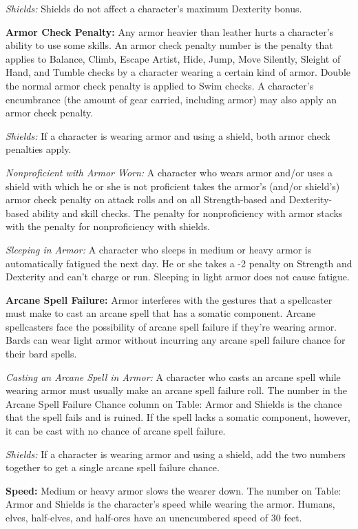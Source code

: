 \documentclass{article}
\begin{document}
\textit{Shields: }Shields do not affect a character's maximum Dexterity bonus.

\textbf{Armor Check Penalty:} Any armor heavier than leather hurts a character's 
ability to use some skills. An armor check penalty number is the penalty that applies 
to Balance, Climb, Escape Artist, Hide, Jump, Move Silently, Sleight of Hand, and 
Tumble checks by a character wearing a certain kind of armor. Double the normal 
armor check penalty is applied to Swim checks. A character's encumbrance (the amount 
of gear carried, including armor) may also apply an armor check penalty.

\textit{Shields: }If a character is wearing armor and using a shield, both armor 
check penalties apply.

\textit{Nonproficient with Armor Worn: }A character who wears armor and/or uses 
a shield with which he or she is not proficient takes the armor's (and/or shield's) 
armor check penalty on attack rolls and on all Strength-based and Dexterity-based 
ability and skill checks. The penalty for nonproficiency with armor stacks with 
the penalty for nonproficiency with shields.

\textit{Sleeping in Armor: }A character who sleeps in medium or heavy armor is 
automatically fatigued the next day. He or she takes a -2 penalty on Strength and 
Dexterity and can't charge or run. Sleeping in light armor does not cause fatigue.

\textbf{Arcane Spell Failure:} Armor interferes with the gestures that a spellcaster 
must make to cast an arcane spell that has a somatic component. Arcane spellcasters 
face the possibility of arcane spell failure if they're wearing armor. Bards can 
wear light armor without incurring any arcane spell failure chance for their bard 
spells.

\textit{Casting an Arcane Spell in Armor: }A character who casts an arcane spell 
while wearing armor must usually make an arcane spell failure roll. The number 
in the Arcane Spell Failure Chance column on Table: Armor and Shields is the chance 
that the spell fails and is ruined. If the spell lacks a somatic component, however, 
it can be cast with no chance of arcane spell failure.

\textit{Shields: }If a character is wearing armor and using a shield, add the two 
numbers together to get a single arcane spell failure chance.

\textbf{Speed:} Medium or heavy armor slows the wearer down. The number on Table: 
Armor and Shields is the character's speed while wearing the armor. Humans, elves, 
half-elves, and half-orcs have an unencumbered speed of 30 feet.
\end{document}
